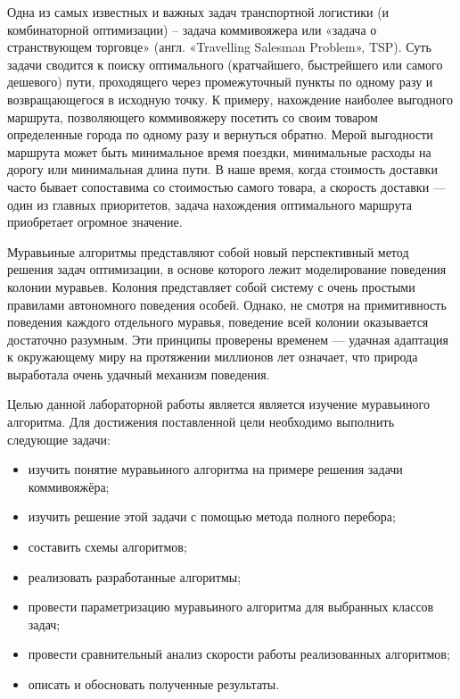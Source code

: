 \setcounter{page}{4}

Одна из самых известных и важных задач транспортной логистики (и комбинаторной оптимизации) – задача коммивояжера или «задача о странствующем торговце» (англ.
«Travelling Salesman Problem», TSP). \cite{travelProblem} Суть задачи сводится к поиску оптимального
(кратчайшего, быстрейшего или самого дешевого) пути, проходящего через промежуточный
пункты по одному разу и возвращающегося в исходную точку. К примеру, нахождение наиболее выгодного маршрута, позволяющего коммивояжеру посетить со своим товаром определенные города по одному разу и вернуться обратно. Мерой выгодности маршрута может быть минимальное время поездки, минимальные расходы на дорогу или минимальная длина пути. В наше время, когда стоимость доставки часто бывает сопоставима со стоимостью самого товара, а скорость доставки — один из главных приоритетов, задача нахождения оптимального маршрута приобретает огромное значение.

Муравьиные алгоритмы \cite{ant} представляют собой новый перспективный метод решения задач оптимизации, в основе которого лежит моделирование поведения колонии муравьев. Колония представляет собой систему с очень простыми правилами автономного поведения особей. Однако, не смотря на примитивность поведения каждого отдельного муравья, поведение всей колонии оказывается достаточно разумным. Эти принципы проверены временем — удачная адаптация к окружающему миру на протяжении миллионов
лет означает, что природа выработала очень удачный механизм поведения.

Целью данной лабораторной работы является является изучение муравьиного алгоритма. Для достижения поставленной цели необходимо выполнить следующие задачи:
\begin{itemize}
	\item изучить понятие муравьиного алгоритма на примере решения задачи коммивояжёра;
	\item изучить решение этой задачи с помощью метода полного перебора;
	\item составить схемы алгоритмов;
	\item реализовать разработанные алгоритмы;
	\item провести параметризацию муравьиного алгоритма для выбранных классов задач;
	\item провести сравнительный анализ скорости работы реализованных алгоритмов;
	\item описать и обосновать полученные результаты.
\end{itemize}